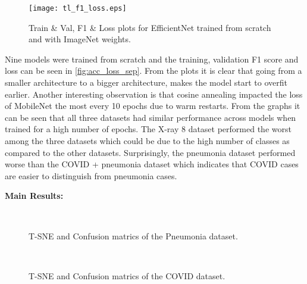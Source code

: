 \documentclass[10pt,twocolumn,letterpaper]{article}
\begin{document}
  \begin{figure}[t]
    \centering
    \texttt{[image: tl\_f1\_loss.eps]}  
     \caption{Train \& Val, F1 \& Loss plots for EfficientNet trained from scratch and with ImageNet weights.}
     \label{fig:tl_acc_loss}
  \end{figure}
Nine models were trained from scratch and the training, validation F1 score and loss can be 
seen in \cref{fig:acc_loss_sep}. From the plots it is clear that going from a smaller 
architecture to a bigger architecture, makes the model start to overfit earlier. Another 
interesting observation is that cosine annealing impacted the loss of MobileNet the most 
every 10 epochs due to warm restarts. From the graphs it can be seen that all three 
datasets had similar performance across models when trained for a high number of epochs. 
The X-ray 8 dataset performed the worst among the three datasets which could be due to the 
high number of classes as compared to the other datasets. Surprisingly, the pneumonia 
dataset performed worse than the COVID + pneumonia dataset which indicates that COVID 
cases are easier to distinguish from pneumonia cases. 

\textbf{Main Results:}

\begin{figure}
  \\
  \caption{T-SNE and Confusion matrics of the Pneumonia dataset.}
  \label{fig:tsne_pneumonia}
\end{figure}

\begin{figure}
  \\
  \caption{T-SNE and Confusion matrics of the COVID dataset.}
  \label{fig:tsne_covid}
\end{figure}
\end{document}
